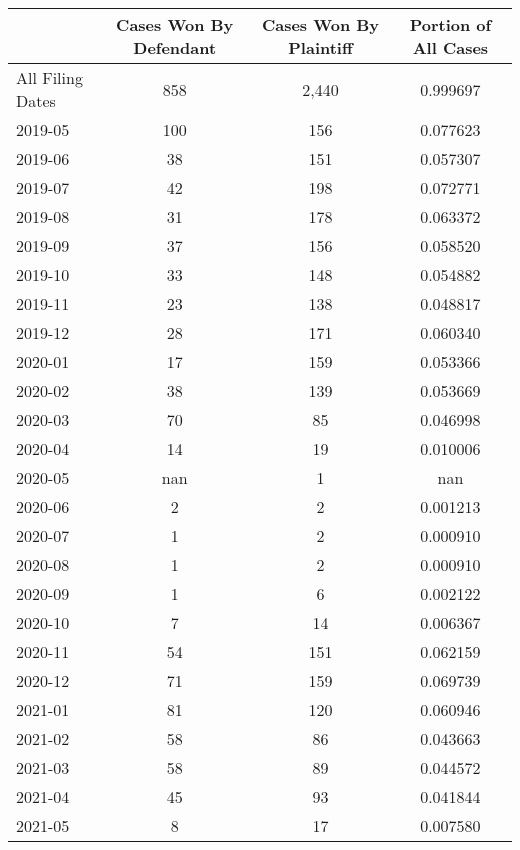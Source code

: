 \begin{tabular}{lccc}
\toprule
 & Cases Won By Defendant & Cases Won By Plaintiff & Portion of All Cases \\
\midrule
All Filing Dates & 858 & 2,440 & 0.999697 \\
2019-05 & 100 & 156 & 0.077623 \\
2019-06 & 38 & 151 & 0.057307 \\
2019-07 & 42 & 198 & 0.072771 \\
2019-08 & 31 & 178 & 0.063372 \\
2019-09 & 37 & 156 & 0.058520 \\
2019-10 & 33 & 148 & 0.054882 \\
2019-11 & 23 & 138 & 0.048817 \\
2019-12 & 28 & 171 & 0.060340 \\
2020-01 & 17 & 159 & 0.053366 \\
2020-02 & 38 & 139 & 0.053669 \\
2020-03 & 70 & 85 & 0.046998 \\
2020-04 & 14 & 19 & 0.010006 \\
2020-05 & nan & 1 & nan \\
2020-06 & 2 & 2 & 0.001213 \\
2020-07 & 1 & 2 & 0.000910 \\
2020-08 & 1 & 2 & 0.000910 \\
2020-09 & 1 & 6 & 0.002122 \\
2020-10 & 7 & 14 & 0.006367 \\
2020-11 & 54 & 151 & 0.062159 \\
2020-12 & 71 & 159 & 0.069739 \\
2021-01 & 81 & 120 & 0.060946 \\
2021-02 & 58 & 86 & 0.043663 \\
2021-03 & 58 & 89 & 0.044572 \\
2021-04 & 45 & 93 & 0.041844 \\
2021-05 & 8 & 17 & 0.007580 \\
\bottomrule
\end{tabular}
